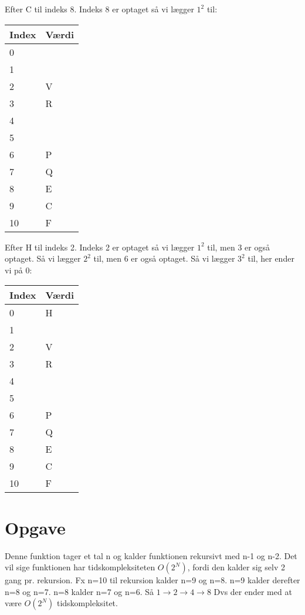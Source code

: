 \documentclass{article}
\begin{document}
Efter C til indeks 8. Indeks 8 er optaget så vi lægger $1^2$ til:
\begin{table}[H]
\centering
\begin{tabular}{|l|l|}
\hline
\rowcolor[HTML]{C0C0C0} 
Index & Værdi \\ \hline
0     &       \\ \hline
1     &       \\ \hline
2     & V     \\ \hline
3     & R     \\ \hline
4     &       \\ \hline
5     &       \\ \hline
6     & P     \\ \hline
7     & Q     \\ \hline
8     & E     \\ \hline
9     & C     \\ \hline
10    & F     \\ \hline
\end{tabular}
\end{table}
Efter H til indeks 2. Indeks 2 er optaget så vi lægger $1^2$ til, men 3 er også
optaget. Så vi lægger $2^2$ til, men 6 er også optaget. Så vi lægger $3^2$ til, 
her ender vi på 0:
\begin{table}[H]
\centering
\begin{tabular}{|l|l|}
\hline
\rowcolor[HTML]{C0C0C0} 
Index & Værdi \\ \hline
0     & H     \\ \hline
1     &       \\ \hline
2     & V     \\ \hline
3     & R     \\ \hline
4     &       \\ \hline
5     &       \\ \hline
6     & P     \\ \hline
7     & Q     \\ \hline
8     & E     \\ \hline
9     & C     \\ \hline
10    & F     \\ \hline
\end{tabular}
\end{table}

\section{Opgave} %
Denne funktion tager et tal n og kalder funktionen rekursivt med n-1 og n-2.
Det vil sige funktionen har tidskompleksiteten $O(2^N)$, fordi den kalder sig 
selv 2 gang pr. rekursion. Fx n=10 til rekursion kalder n=9 og n=8. 
n=9 kalder derefter n=8 og n=7. n=8 kalder n=7 og n=6. Så $1 \to 2 \to 4 \to 8$
Dvs der ender med at være $O(2^N)$ tidskompleksitet.
\end{document}
